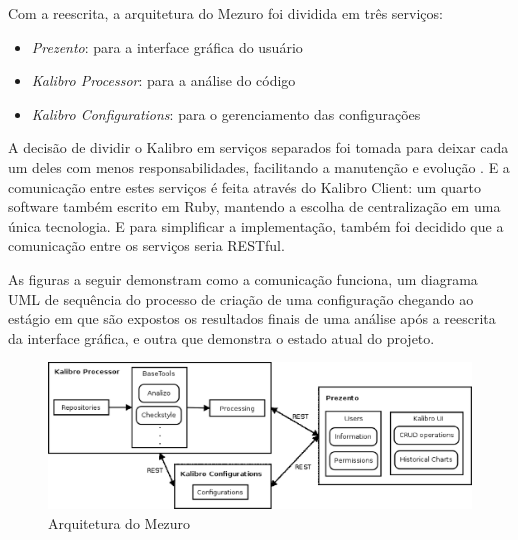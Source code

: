 Com a reescrita, a arquitetura do Mezuro foi dividida em três serviços:

\begin{itemize}
  \item \textit{Prezento}: para a interface gráfica do usuário
  \item \textit{Kalibro Processor}: para a análise do código
  \item \textit{Kalibro Configurations}: para o gerenciamento das configurações
\end{itemize}

A decisão de dividir o Kalibro em serviços separados foi tomada para deixar
cada um deles com menos responsabilidades, facilitando a manutenção e evolução
\cite{camarinhaOSS2015}. E a comunicação entre estes serviços é feita através
do Kalibro Client: um quarto software também escrito em Ruby, mantendo a
escolha de centralização em uma única tecnologia. E para simplificar a
implementação, também foi decidido que a comunicação entre os serviços seria
RESTful.

As figuras a seguir demonstram como a comunicação funciona, um diagrama UML de
sequência do processo de criação de uma configuração chegando ao estágio em que
são expostos os resultados finais de uma análise após a reescrita da interface
gráfica, e outra que demonstra o estado atual do projeto.

\begin{figure}[!htb]
	\centering
    \includegraphics[keepaspectratio=true,scale=0.5]
    {figuras/mezuroCloudArch.eps}
  \caption{Arquitetura do Mezuro \cite{camarinhaOSS2015}}
	\label{fig:mezuroNoosferoArch}
\end{figure}


